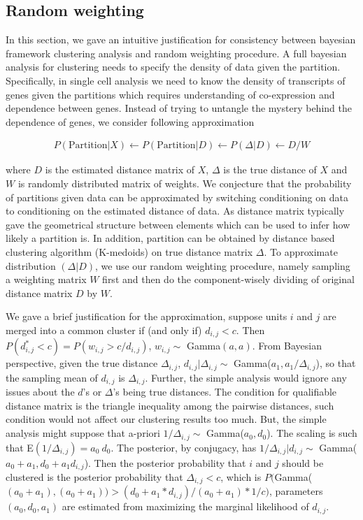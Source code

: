 \documentclass[11pt]{amsart}
\begin{document}
\subsection{Random weighting}
In this section, we gave an intuitive justification for consistency between bayesian framework clustering analysis and random weighting procedure. A full bayesian analysis for clustering needs to specify the density of data given the partition. Specifically, in single cell analysis we need to know the density of transcripts of genes given the partitions which requires understanding of co-expression and dependence between genes. Instead of trying to untangle the mystery behind the dependence of genes, we consider following approximation 

\begin{eqnarray*}
P(\text{Partition} | X) \leftarrow P(\text{Partition} | D) \leftarrow P(\Delta | D) \leftarrow D / W
\end{eqnarray*} 

where $D$ is the estimated distance matrix of $X$, $\Delta$ is the true distance of $X$ and $W$ is randomly distributed matrix of weights. We conjecture that the probability of partitions given data can be approximated by switching conditioning on data to conditioning on the estimated distance of data. As distance matrix typically gave the geometrical structure between elements which can be used to infer how likely a partition is.  In addition, partition can be obtained by  distance based clustering algorithm (K-medoids) on true distance matrix $\Delta$.  To approximate distribution $(\Delta | D)$, we use our random weighting procedure, namely sampling a weighting matrix $W$ first and then do the component-wisely dividing of original distance matrix $D$ by $W$.

We gave a brief justification for the approximation, suppose units $i$ and $j$ are merged into a common cluster if (and only if) $d_{i,j} < c$. Then $P(d^*_{i,j} < c) = P(w_{i,j} > c / d_{i,j})$, $w_{i,j} \sim$ Gamma$(a, a)$. From Bayesian perspective, given the true distance $\Delta_{i,j}$, $d_{i,j} | \Delta_{i,j} \sim$ Gamma($a_1, a_1 / \Delta_{i,j}$), so that the sampling mean of $d_{i,j}$ is $\Delta_{i,j}$.  Further, the simple analysis would ignore any issues about the $d$'s or $\Delta$'s being true distances. The condition for qualifiable distance matrix is the triangle inequality among the pairwise distances, such condition would not affect our clustering results too much. But, the simple analysis might suppose that a-priori $1 / \Delta_{i,j} \sim$ Gamma($a_0, d_0$). The scaling is such that E$(1 / \Delta_{i,j}) = a_0 \ d_0$. The posterior, by conjugacy, has $1 / \Delta_{i,j} | d_{i,j} \sim$ Gamma($a_0 + a_1, d_0 + a_1d_{i,j}$). Then the posterior probability that $i$ and $j$ should be clustered is the posterior probability that $\Delta_{i,j} < c$, which is $P($Gamma($(a_0 + a_1),(a_0 + a_1)) > (d_0 + a_1 * d_{i,j}) / (a_0 + a_1) * 1/c )$, parameters $(a_0, d_0, a_1)$ are estimated from maximizing the marginal likelihood of $d_{i,j}$.
\end{document}
